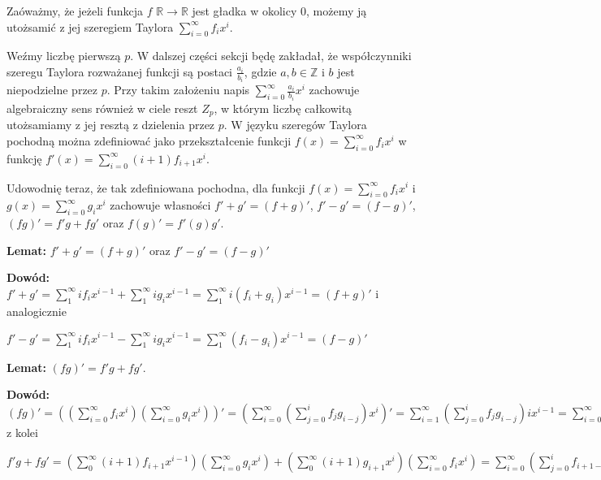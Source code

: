 \documentclass{article}
\begin{document}
Zaóważmy, że jeżeli funkcja $f$ $\mathbb{R}\to \mathbb{R}$ jest gładka w okolicy $0$, możemy ją utożsamić z jej szeregiem Taylora $\sum_{i=0}^{\infty}f_ix^i$. 

Weźmy liczbę pierwszą $p$. W dalszej części sekcji będę zakładał, że współczynniki szeregu Taylora 
rozważanej funkcji są postaci 
$\frac{a_i}{b_i}$, gdzie $a,b \in \mathbb{Z}$ i  $b$ jest niepodzielne przez $p$. Przy takim założeniu napis  
$\sum_{i=0}^{\infty}\frac{a_i}{b_i}x^i$ zachowuje algebraiczny sens również w ciele reszt $Z_p$, w którym 
liczbę całkowitą utożsamiamy z jej resztą z dzielenia przez $p$. W języku szeregów Taylora pochodną można 
zdefiniować jako przekształcenie funkcji $f(x)=\sum_{i=0}^\infty f_ix^i$ w funkcję 
$f '(x)=\sum_{i=0}^{\infty}(i+1)f_{i+1}x^i$. 

Udowodnię teraz, że tak zdefiniowana pochodna, dla funkcji $f(x)=\sum_{i=0}^{\infty}f_ix^i$ i
$g(x)=\sum_{i=0}^{\infty}g_ix^i$ zachowuje własności $f'+g'=(f+g)'$, $f'-g'=(f-g)'$, $(fg)'=f'g+fg'$ oraz 
$f(g)'=f'(g)g'$.

\begin{tcolorbox}
    \textbf{Lemat:} $f'+g'=(f+g)'$ oraz $f'-g'=(f-g)'$
    
    \textbf{Dowód:} $f'+g'=\sum_{1}^{\infty}if_ix^{i-1}+\sum_{1}^{\infty}ig_ix^{i-1}=
    \sum_{1}^{\infty}i(f_i+g_i)x^{i-1}=(f+g)'$ i analogicznie
    
    $f'-g'=\sum_{1}^{\infty}if_ix^{i-1}-\sum_{1}^{\infty}ig_ix^{i-1}=
    \sum_{1}^{\infty}(f_i-g_i)x^{i-1}=(f-g)'$ 
\end{tcolorbox}

\begin{tcolorbox}
    \textbf{Lemat:} $(fg)'=f'g+fg'$.
    
    \textbf{Dowód:} $(fg)'=((\sum_{i=0}^{\infty}f_ix^i)(\sum_{i=0}^{\infty}g_ix^i))'=
    (\sum_{i=0}^{\infty}(\sum_{j=0}^if_jg_{i-j})x^i)'=
    \sum_{i=1}^{\infty}(\sum_{j=0}^if_jg_{i-j})ix^{i-1}=
    \sum_{i=0}^{\infty}(\sum_{j=0}^if_jg_{i+1-j})(i+1)x^{i}$ z kolei

    $f'g+fg'=(\sum_{0}^{\infty}(i+1)f_{i+1}x^{i-1})(\sum_{i=0}^{\infty}g_ix^i)+(\sum_{0}^{\infty}(i+1)g_{i+1}x^{i})(\sum_{i=0}^{\infty}f_ix^i)=
    \sum_{i=0}^\infty(\sum_{j=0}^{i}f_{i+1-j}g_{j}(i+1-j))x^i+
    \sum_{i=0}^\infty(\sum_{j=0}^{i}g_{i+1-j}f_{j}(i+1-j))x^i=
    \sum_{i=0}^\infty(\sum_{j=0}^{i}g_{i+1-j}f_{j}(i+1-j+j))x^i=
    \sum_{i=0}^\infty(\sum_{j=0}^{i}g_{i+1-j}f_{j})(i+1)x^i=(fg)'
    $
\end{tcolorbox}
\end{document}
